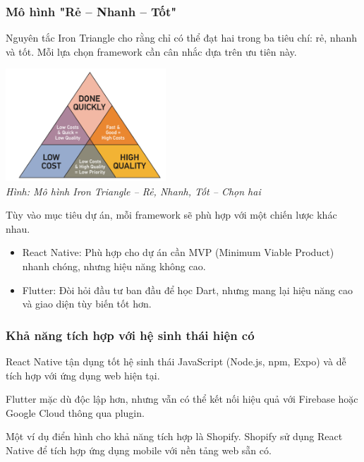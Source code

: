 \begin{flushleft}
    \subsubsection{Mô hình "Rẻ – Nhanh – Tốt"}
    \begin{flushleft}
      \hspace*{0.8cm}Nguyên tắc Iron Triangle cho rằng chỉ có thể đạt hai trong ba tiêu chí: rẻ, nhanh và tốt. Mỗi lựa chọn framework cần cân nhắc dựa trên ưu tiên này.
    \end{flushleft}
    
    \begin{flushleft}
      \centering
      \includegraphics[width=0.45\textwidth]{images/iron_triangle.png} \\
      \textit{\small Hình: Mô hình Iron Triangle – Rẻ, Nhanh, Tốt – Chọn hai}
    \end{flushleft}
    
    \begin{flushleft}
      \hspace*{0.8cm}Tùy vào mục tiêu dự án, mỗi framework sẽ phù hợp với một chiến lược khác nhau.
      \setlength{\leftmargini}{1.5cm}
      \begin{itemize}
          \item React Native: Phù hợp cho dự án cần MVP (Minimum Viable Product) nhanh chóng, nhưng hiệu năng không cao.
          \item Flutter: Đòi hỏi đầu tư ban đầu để học Dart, nhưng mang lại hiệu năng cao và giao diện tùy biến tốt hơn.
      \end{itemize}
    \end{flushleft}
    

  \subsubsection{Khả năng tích hợp với hệ sinh thái hiện có}
      \hspace*{0.8cm}React Native tận dụng tốt hệ sinh thái JavaScript (Node.js, npm, Expo) và dễ tích hợp với ứng dụng web hiện tại.

      \hspace*{0.8cm}Flutter mặc dù độc lập hơn, nhưng vẫn có thể kết nối hiệu quả với Firebase hoặc Google Cloud thông qua plugin.
  
      \hspace*{0.8cm}Một ví dụ điển hình cho khả năng tích hợp là Shopify. Shopify sử dụng React Native để tích hợp ứng dụng mobile với nền tảng web sẵn có.    

\end{flushleft}



